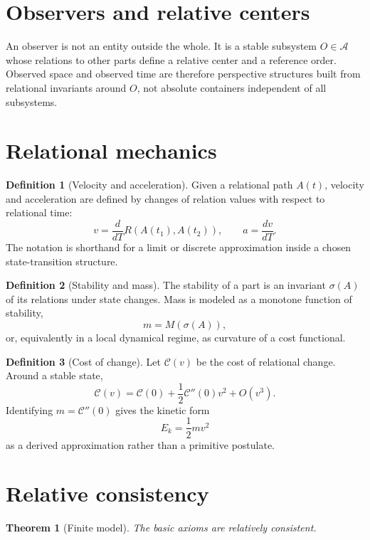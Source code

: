 \documentclass[11pt,a4paper]{article}
\theoremstyle{definition}
\newtheorem{definition}{Definition}[section]
\theoremstyle{plain}
\newtheorem{theorem}{Theorem}[section]
\theoremstyle{remark}
\newcommand{\Parts}{\mathcal A}
\newcommand{\Rel}{R}
\newcommand{\Stab}{\sigma}
\newcommand{\Cost}{\mathcal C}
\begin{document}
\section{Observers and relative centers}

An observer is not an entity outside the whole. It is a stable subsystem
\(O\in\Parts\) whose relations to other parts define a relative center and a
reference order. Observed space and observed time are therefore perspective
structures built from relational invariants around \(O\), not absolute
containers independent of all subsystems.

\section{Relational mechanics}

\begin{definition}[Velocity and acceleration]
Given a relational path \(A(t)\), velocity and acceleration are defined by
changes of relation values with respect to relational time:
\[
v=\frac{d}{dT}\Rel(A(t_1),A(t_2)),\qquad
a=\frac{d v}{dT}.
\]
The notation is shorthand for a limit or discrete approximation inside a chosen
state-transition structure.
\end{definition}

\begin{definition}[Stability and mass]
The stability of a part is an invariant \(\Stab(A)\) of its relations under
state changes. Mass is modeled as a monotone function of stability,
\[
m=M(\Stab(A)),
\]
or, equivalently in a local dynamical regime, as curvature of a cost functional.
\end{definition}

\begin{definition}[Cost of change]
Let \(\Cost(v)\) be the cost of relational change. Around a stable state,
\[
\Cost(v)=\Cost(0)+\frac12\Cost''(0)v^2+O(v^3).
\]
Identifying \(m=\Cost''(0)\) gives the kinetic form
\[
E_k=\frac12 m v^2
\]
as a derived approximation rather than a primitive postulate.
\end{definition}

\section{Relative consistency}

\begin{theorem}[Finite model]
The basic axioms are relatively consistent.
\end{theorem}
\end{document}

